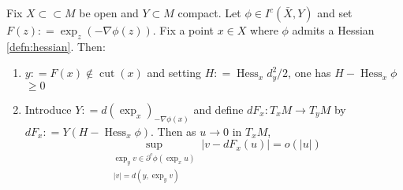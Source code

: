 \begin{prop} 
	\label{prop:differentiate_optimal_transport}
	Fix \( X \subset \subset M \) be open and \( Y \subset M \) compact.
	Let \( \phi \in I ^ { c } ( \bar { X } , Y ) \) and set \( F ( z ) : = \exp _ { z } ( - \nabla \phi ( z ) ) . \)
	Fix a point \( x \in X \) where \( \phi \) admits a Hessian \cref{defn:hessian}.
	Then:
	\begin{enumerate}
		\item \( y : = F ( x ) \notin \operatorname { cut } ( x ) \) and setting \( H : = \operatorname { Hess } _ { x } d _ { y } ^ { 2 } / 2 \), one has \( H - \operatorname { Hess } _ { x } \phi \) \( \geq 0 \)
		\item Introduce \( Y : = d \left( \exp _ { x } \right) _ { - \nabla \phi ( x ) } \) and define \( d F _ { x } : T _ { x } M \longrightarrow T _ { y } M \) by
		      \( d F _ { x } : = Y \left( H - \operatorname { Hess } _ { x } \phi \right) \). Then as \( u \rightarrow 0 \) in \( T _ { x } M \),
		      \begin{equation}
			      \sup _ {\substack {\exp _ { y } v \in \partial ^ { c } \phi \left( \exp _ { x } u \right) \\ | v | = d \left( y , \exp _ { y } v \right)} } \left| v - d F _ { x } ( u ) \right| = o ( | u | )
		      \end{equation}

	\end{enumerate}
\end{prop}

